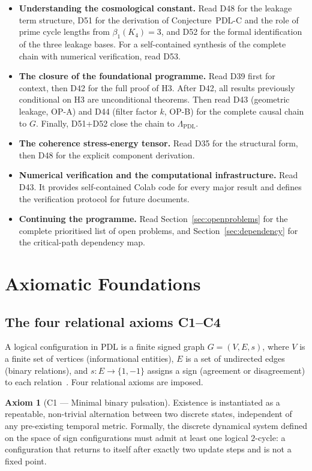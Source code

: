 \documentclass[11pt,a4paper]{article}
\theoremstyle{plain}
\theoremstyle{definition}
\newtheorem{axiom}[theorem]{Axiom}
\theoremstyle{remark}
\begin{document}
\begin{itemize}
\item \textbf{Understanding the cosmological constant.} Read D48 for the leakage term structure, D51 for the derivation of Conjecture~PDL-C and the role of prime cycle lengths from $\beta_1(K_4)=3$, and D52 for the formal identification of the three leakage bases. For a self-contained synthesis of the complete chain with numerical verification, read D53.
\item \textbf{The closure of the foundational programme.} Read D39 first for context, then D42 for the full proof of H3. After D42, all results previously conditional on H3 are unconditional theorems. Then read D43 (geometric leakage, OP-A) and D44 (filter factor $k$, OP-B) for the complete causal chain to $G$. Finally, D51+D52 close the chain to $\Lambda_{\mathrm{PDL}}$.
\item \textbf{The coherence stress-energy tensor.} Read D35 for the structural form, then D48 for the explicit component derivation.
\item \textbf{Numerical verification and the computational infrastructure.} Read D43. It provides self-contained Colab code for every major result and defines the verification protocol for future documents.
\item \textbf{Continuing the programme.} Read Section~\ref{sec:openproblems} for the complete prioritised list of open problems, and Section~\ref{sec:dependency} for the critical-path dependency map.
\end{itemize}

\section{Axiomatic Foundations}
\label{sec:axioms}

\subsection{The four relational axioms C1--C4}
\label{subsec:axioms}
A logical configuration in PDL is a finite signed graph $G=(V,E,s)$, where $V$ is a finite set of vertices (informational entities), $E$ is a set of undirected edges (binary relations), and $s\colon E\to\{1,-1\}$ assigns a sign (agreement or disagreement) to each relation~\cite{D01,D02}. Four relational axioms are imposed.

\begin{axiom}[C1 --- Minimal binary pulsation]
Existence is instantiated as a repeatable, non-trivial alternation between two discrete states, independent of any pre-existing temporal metric. Formally, the discrete dynamical system defined on the space of sign configurations must admit at least one logical $2$-cycle: a configuration that returns to itself after exactly two update steps and is not a fixed point.
\end{axiom}
\end{document}
